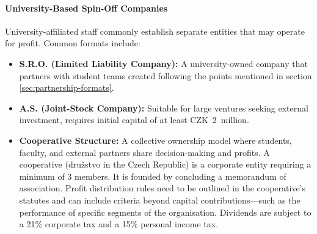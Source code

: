 \paragraph{University-Based Spin-Off Companies}
University-affiliated staff commonly establish separate entities that may operate for profit. Common formats include:
\begin{itemize}
    \item \textbf{S.R.O. (Limited Liability Company):} A university-owned company that partners with student teams created following the points mentioned in section \ref{sec:partnership-formats}.
    \item \textbf{A.S. (Joint-Stock Company):} Suitable for large ventures seeking external investment, requires initial capital of at least CZK~2~million. \cite{jake-obchodni-spolecnosti}
    \item \textbf{Cooperative Structure:} A collective ownership model where students, faculty, and external partners share decision-making and profits. A cooperative (družstvo in the Czech Republic) is a corporate entity requiring a minimum of 3 members. It is founded by concluding a memorandum of association. Profit distribution rules need to be outlined in the cooperative’s statutes and can include criteria beyond capital contributions---such as the performance of specific segments of the organisation. Dividends are subject to a 21\% corporate tax and a 15\% personal income tax. \cite{preuss-coop, team-coop, businessinfo-coop}
\end{itemize}
